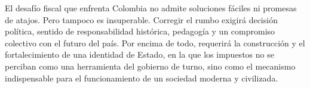 \begin{epilogo}
El desafío fiscal que enfrenta Colombia no admite soluciones fáciles ni promesas de atajos. Pero tampoco es insuperable. Corregir el rumbo exigirá decisión política, sentido de responsabilidad histórica, pedagogía y un compromiso colectivo con el futuro del país. Por encima de todo, requerirá la construcción y el fortalecimiento de una identidad de Estado, en la que los impuestos no se perciban como una herramienta del gobierno de turno, sino como el mecanismo indispensable para el funcionamiento de un sociedad moderna y civilizada.

\end{epilogo}
